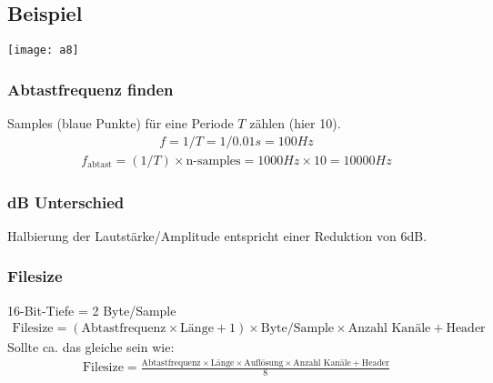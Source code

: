 \subsection{Beispiel}
\begin{center}
    \texttt{[image: a8]}
\end{center}
\subsubsection{Abtastfrequenz finden}
Samples (blaue Punkte) für eine Periode $T$ zählen (hier 10).
\begin{align*}
    f = 1 / T = 1 / 0.01s = 100Hz
\end{align*}
\begin{align*}
    f_{\text{abtast}} = (1 / T) \times \text{n-samples} = 1000Hz \times 10 = 10000Hz
\end{align*}
\subsubsection{dB Unterschied}
Halbierung der Lautstärke/Amplitude entspricht einer Reduktion von 6dB. 
\subsubsection{Filesize}
16-Bit-Tiefe = 2 Byte/Sample
\begin{align*}
    \text{Filesize} = (\text{Abtastfrequenz} \times \text{Länge} + 1) \times \text{Byte/Sample} \times \text{Anzahl Kanäle} + \text{Header}
\end{align*}
Sollte ca. das gleiche sein wie:
\begin{align*}
    \text{Filesize} = \frac{\text{Abtastfrequenz} \times \text{Länge} \times \text{Auflösung} \times \text{Anzahl Kanäle} + \text{Header}}{8}
\end{align*}